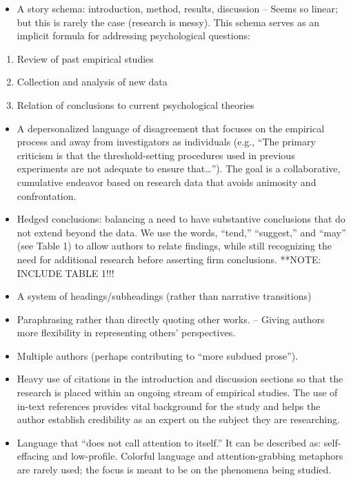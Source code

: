 \documentclass[
  11pt,
]{book}
\providecommand{\tightlist}{%
  \setlength{\itemsep}{0pt}\setlength{\parskip}{0pt}}
\begin{document}
\begin{itemize}
\tightlist
\item
  A story schema: introduction, method, results, discussion
  -- Seems so linear; but this is rarely the case (research is messy). This schema serves as an implicit formula for addressing psychological questions:
\end{itemize}

\begin{enumerate}
\def\labelenumi{\arabic{enumi})}
\tightlist
\item
  Review of past empirical studies
\item
  Collection and analysis of new data
\item
  Relation of conclusions to current psychological theories
\end{enumerate}

\begin{itemize}
\tightlist
\item
  A depersonalized language of disagreement that focuses on the empirical process and away from investigators as individuals (e.g., ``The primary criticism is that the threshold-setting procedures used in previous experiments are not adequate to ensure that\ldots{}''). The goal is a collaborative, cumulative endeavor based on research data that avoids animosity and confrontation.
\item
  Hedged conclusions: balancing a need to have substantive conclusions that do not extend beyond the data. We use the words, ``tend,'' ``suggest,'' and ``may'' (see Table 1) to allow authors to relate findings, while still recognizing the need for additional research before asserting firm conclusions. **NOTE: INCLUDE TABLE 1!!!
\item
  A system of headings/subheadings (rather than narrative transitions)
\item
  Paraphrasing rather than directly quoting other works.
  -- Giving authors more flexibility in representing others' perspectives.
\item
  Multiple authors (perhaps contributing to ``more subdued prose'').
\item
  Heavy use of citations in the introduction and discussion sections so that the research is placed within an ongoing stream of empirical studies. The use of in-text references provides vital background for the study and helps the author establish credibility as an expert on the subject they are researching.
\item
  Language that ``does not call attention to itself.'' It can be described as: self-effacing and low-profile. Colorful language and attention-grabbing metaphors are rarely used; the focus is meant to be on the phenomena being studied.
\end{itemize}
\end{document}
